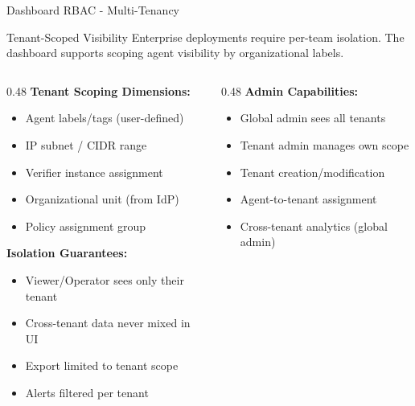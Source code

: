 \begin{frame}{Dashboard RBAC - Multi-Tenancy}
  \begin{block}{Tenant-Scoped Visibility}
    \scriptsize
    Enterprise deployments require per-team isolation. The dashboard supports
    scoping agent visibility by organizational labels.
  \end{block}

  \vspace{0.2cm}

  \scriptsize
  \begin{columns}[T]
    \begin{column}{0.48\textwidth}
      \textbf{Tenant Scoping Dimensions:}
      \begin{itemize}
        \item Agent labels/tags (user-defined)
        \item IP subnet / CIDR range
        \item Verifier instance assignment
        \item Organizational unit (from IdP)
        \item Policy assignment group
      \end{itemize}

      \vspace{0.15cm}

      \textbf{Isolation Guarantees:}
      \begin{itemize}
        \item Viewer/Operator sees only their tenant
        \item Cross-tenant data never mixed in UI
        \item Export limited to tenant scope
        \item Alerts filtered per tenant
      \end{itemize}
    \end{column}
    \begin{column}{0.48\textwidth}
      \textbf{Admin Capabilities:}
      \begin{itemize}
        \item Global admin sees all tenants
        \item Tenant admin manages own scope
        \item Tenant creation/modification
        \item Agent-to-tenant assignment
        \item Cross-tenant analytics (global admin)
      \end{itemize}


\end{column}
\end{columns}
\end{frame}
